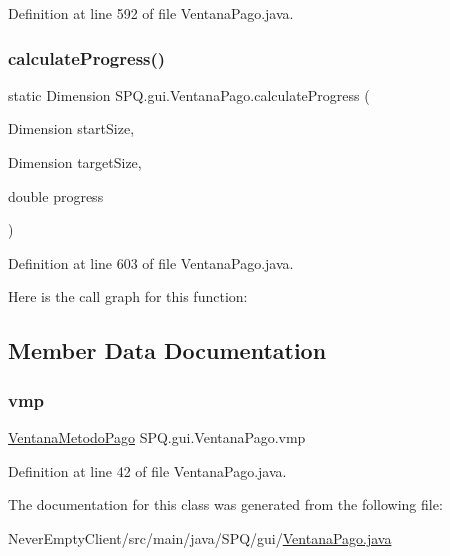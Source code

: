 Definition at line 592 of file Ventana\+Pago.\+java.

\mbox{\label{class_s_p_q_1_1gui_1_1_ventana_pago_a40ab2ece25e6d7c17d9704d5172be76c}} 
\subsubsection{\texorpdfstring{calculate\+Progress()}{calculateProgress()}\hspace{0.1cm}{\footnotesize\ttfamily [4/4]}}
{\footnotesize\ttfamily static Dimension S\+P\+Q.\+gui.\+Ventana\+Pago.\+calculate\+Progress (\begin{DoxyParamCaption}\item[{Dimension}]{start\+Size,  }\item[{Dimension}]{target\+Size,  }\item[{double}]{progress }\end{DoxyParamCaption})\hspace{0.3cm}{\ttfamily [static]}}



Definition at line 603 of file Ventana\+Pago.\+java.

Here is the call graph for this function\+:


\subsection{Member Data Documentation}
\mbox{\label{class_s_p_q_1_1gui_1_1_ventana_pago_a892d5d5fa9310e73e222681af8d5a53f}} 
\subsubsection{\texorpdfstring{vmp}{vmp}}
{\footnotesize\ttfamily \mbox{\hyperlink{class_s_p_q_1_1gui_1_1_ventana_metodo_pago}{Ventana\+Metodo\+Pago}} S\+P\+Q.\+gui.\+Ventana\+Pago.\+vmp\hspace{0.3cm}{\ttfamily [static]}}



Definition at line 42 of file Ventana\+Pago.\+java.



The documentation for this class was generated from the following file\+:\begin{DoxyCompactItemize}
\item 
Never\+Empty\+Client/src/main/java/\+S\+P\+Q/gui/\mbox{\hyperlink{_ventana_pago_8java}{Ventana\+Pago.\+java}}\end{DoxyCompactItemize}
